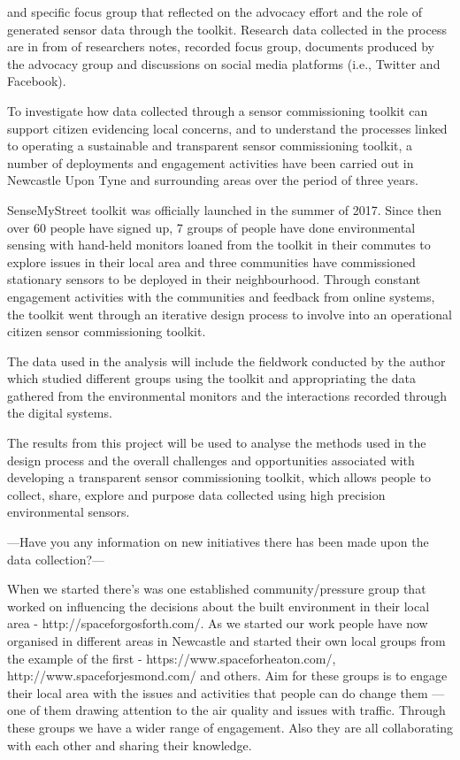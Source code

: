 and specific focus group that reflected on the advocacy effort and the role of generated sensor data through the toolkit. Research data collected in the process are in from of researchers notes, recorded focus group, documents produced by the advocacy group and discussions on social media platforms (i.e., Twitter and Facebook).



To investigate how data collected through a sensor commissioning toolkit can support citizen evidencing local concerns, and to understand the processes linked to operating a sustainable and transparent sensor commissioning toolkit, a number of deployments and engagement activities have been carried out in Newcastle Upon Tyne and surrounding areas over the period of three years. 

 SenseMyStreet toolkit was officially launched in the summer of 2017. Since then over 60 people have signed up, 7 groups of people have done environmental sensing with hand-held monitors loaned from the toolkit in their commutes to explore issues in their local area and three communities have commissioned stationary sensors to be deployed in their neighbourhood. Through constant engagement activities with the communities and feedback from online systems, the toolkit went through an iterative design process to involve into an operational citizen sensor commissioning toolkit.
 
 
 The data used in the analysis will include the fieldwork conducted by the author which studied different groups using the toolkit and appropriating the data gathered from the environmental monitors and the interactions recorded through the digital systems. 

The results from this project will be used to analyse the methods used in the design process and the overall challenges and opportunities associated with developing a transparent sensor commissioning toolkit, which allows people to collect, share, explore and purpose data collected using high precision environmental sensors.


---Have you any information on new initiatives there has been made upon the data collection?---

When we started there’s was one established community/pressure group that worked on influencing the decisions about the built environment in their local area - http://spaceforgosforth.com/. As we started our work people have now organised in different areas in Newcastle and started their own local groups from the example of the first - https://www.spaceforheaton.com/,  http://www.spaceforjesmond.com/ and others. Aim for these groups is to engage their local area with the issues and activities that people can do change them — one of them drawing attention to the air quality and issues with traffic. Through these groups we have a wider range of engagement. Also they are all collaborating with each other and sharing their knowledge.

